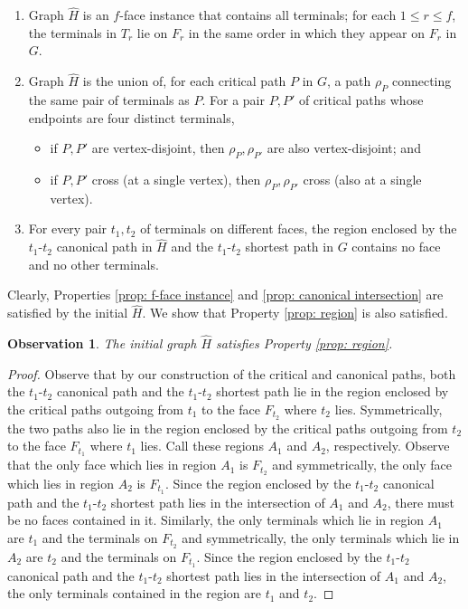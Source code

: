 \documentclass[11pt]{article}
\newtheorem{observation}[theorem]{Observation}
\begin{document}
\begin{enumerate}
\item Graph $\hat H$ is an $f$-face instance that contains all terminals; for each $1\le r\le f$, the terminals in $T_r$ lie on $F_r$ in the same order in which they appear on $F_r$ in $G$.
\label{prop: f-face instance}
\item Graph $\hat H$ is the union of, for each critical path $P$ in $G$, a path $\rho_P$ connecting the same pair of terminals as $P$. For a pair $P,P'$ of critical paths whose endpoints are four distinct terminals, \label{prop: canonical intersection}
\begin{itemize}
    \item if $P,P'$ are vertex-disjoint, then $\rho_P,\rho_{P'}$ are also vertex-disjoint; and
    \item if $P,P'$ cross (at a single vertex), then $\rho_P,\rho_{P'}$ cross (also at a single vertex).
\end{itemize}
\item For every pair $t_1,t_2$ of terminals on different faces, the region enclosed by the $t_1$-$t_2$ canonical path in $\hat H$ and the $t_1$-$t_2$ shortest path in $G$ contains no face and no other terminals.
\label{prop: region}
\end{enumerate}

Clearly, Properties \ref{prop: f-face instance} and \ref{prop: canonical intersection} are satisfied by the initial $\hat H$. We show that Property \ref{prop: region} is also satisfied.

\begin{observation}
The initial graph $\hat H$ satisfies Property \ref{prop: region}.
\end{observation}
\begin{proof}
    Observe that by our construction of the critical and canonical paths, both the $t_1$-$t_2$ canonical path and the $t_1$-$t_2$ shortest path lie in the region enclosed by the critical paths outgoing from $t_1$ to the face $F_{t_2}$ where $t_2$ lies. Symmetrically, the two paths also lie in the region enclosed by the critical paths outgoing from $t_2$ to the face $F_{t_1}$ where $t_1$ lies. Call these regions $A_1$ and $A_2$, respectively. Observe that the only face which lies in region $A_1$ is $F_{t_2}$ and symmetrically, the only face which lies in region $A_2$ is $F_{t_1}$. Since the region enclosed by the $t_1$-$t_2$ canonical path and the $t_1$-$t_2$ shortest path lies in the intersection of $A_1$ and $A_2$, there must be no faces contained in it. Similarly, the only terminals which lie in region $A_1$ are $t_1$ and the terminals on $F_{t_2}$ and symmetrically, the only terminals which lie in $A_2$ are $t_2$ and the terminals on $F_{t_1}$. Since the region enclosed by the $t_1$-$t_2$ canonical path and the $t_1$-$t_2$ shortest path lies in the intersection of $A_1$ and $A_2$, the only terminals contained in the region are $t_1$ and $t_2$.
\end{proof}
\end{document}
